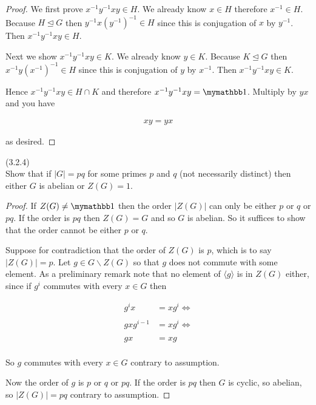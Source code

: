\documentclass{exam}
\begin{document}
\begin{questions}
\begin{proof}
  We first prove $x^{-1}y^{-1}xy \in H$.  We already know $x\in H$ therefore $x^{-1}\in H$.  Because $H\trianglelefteq G$ then $y^{-1}x(y^{-1})^{-1}\in H$ since this is conjugation of $x$ by $y^{-1}$.  Then $x^{-1}y^{-1}xy\in H$.

  Next we show $x^{-1}y^{-1}xy \in K$.  We already know $y\in K$.  Because $K\trianglelefteq G$ then $x^{-1}y(x^{-1})^{-1}\in H$ since this is conjugation of $y$ by $x^{-1}$.  Then $x^{-1}y^{-1}xy\in K$.

  Hence $x^{-1}y^{-1}xy \in H\cap K$ and therefore $x^{-1}y^{-1}xy =\mymathbb 1$.  Multiply by $yx$ and you have

  \begin{align*}
    xy = yx
  \end{align*}

  as desired.
\end{proof}

\question(3.2.4)\\
Show that if $|G|=pq$ for some primes $p$ and $q$ (not necessarily distinct) then either $G$ is abelian or $Z(G)=1$.

\begin{proof}
  If $Z(G)\ne \mymathbb 1$ then the order $|Z(G)|$ can only be either $p$ or $q$ or $pq$.  If the order is $pq$ then $Z(G)=G$ and so $G$ is abelian.  So it suffices to show that the order cannot be either $p$ or $q$.

  Suppose for contradiction that the order of $Z(G)$ is $p$, which is to say $|Z(G)|=p$.  Let $g\in G\smallsetminus Z(G)$ so that $g$ does not commute with some element.  As a preliminary remark note that no element of $\langle g\rangle$ is in $Z(G)$ either, since if $g^i$ commutes with every $x\in G$ then

  \begin{align*}
    g^i x &= xg^i \Leftrightarrow \\\\
    gxg^{i-1} &= xg^i \Leftrightarrow \\\\
    gx &= xg\\
  \end{align*}

  So $g$ commutes with every $x\in G$ contrary to assumption.

  Now the order of $g$ is $p$ or $q$ or $pq$.  If the order is $pq$ then $G$ is cyclic, so abelian, so $|Z(G)|=pq$ contrary to assumption.


\end{proof}
\end{questions}
\end{document}
